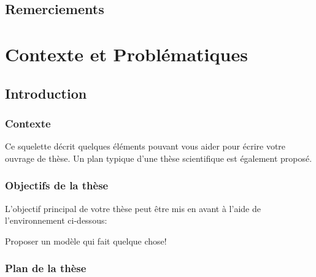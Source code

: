 \documentclass[french]{spimubphdthesis}
\begin{document}
 

\chapter*{Remerciements}
 
\tableofcontents

\mainmatter
 
\part{Contexte et Problématiques}

\chapter{Introduction}
 
\section{Contexte}

Ce squelette décrit quelques éléments pouvant vous aider pour écrire votre ouvrage de thèse.
Un plan typique d'une thèse scientifique est également proposé.

\section{Objectifs de la thèse}

L'objectif principal de votre thèse peut être mis en avant à l'aide de l'environnement ci-dessous:

\begin{emphbox}
	Proposer un modèle qui fait quelque chose!
\end{emphbox}

\section{Plan de la thèse}
\end{document}
